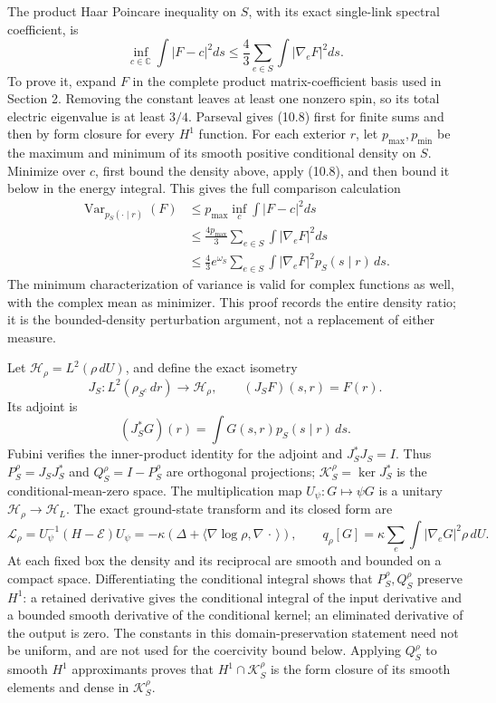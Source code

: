\documentclass[
]{article}
\begin{document}
The product Haar Poincare inequality on \(S\), with its exact
single-link spectral coefficient, is \[
\inf_{c\in\mathbb C}\int|F-c|^2ds
\le\frac43\sum_{e\in S}\int|\nabla_eF|^2ds.                     \tag{10.8}
\] To prove it, expand \(F\) in the complete product matrix-coefficient
basis used in Section 2. Removing the constant leaves at least one
nonzero spin, so its total electric eigenvalue is at least \(3/4\).
Parseval gives (10.8) first for finite sums and then by form closure for
every \(H^1\) function. For each exterior \(r\), let
\(p_{\max},p_{\min}\) be the maximum and minimum of its smooth positive
conditional density on \(S\). Minimize over \(c\), first bound the
density above, apply (10.8), and then bound it below in the energy
integral. This gives the full comparison calculation \[
\begin{split}
\operatorname{Var}_{p_S(\cdot\mid r)}(F)
&\le p_{\max}\inf_c\int|F-c|^2ds\\
&\le\frac{4p_{\max}}3\sum_{e\in S}\int|\nabla_eF|^2ds\\
&\le\frac43 e^{\omega_S}
       \sum_{e\in S}\int|\nabla_eF|^2p_S(s\mid r)\,ds .
\end{split}                                                   \tag{10.9}
\] The minimum characterization of variance is valid for complex
functions as well, with the complex mean as minimizer. This proof
records the entire density ratio; it is the bounded-density perturbation
argument, not a replacement of either measure.

Let \(\mathscr H_\rho=L^2(\rho\,dU)\), and define the exact isometry \[
J_S:L^2(\rho_{S^c}\,dr)\longrightarrow\mathscr H_\rho,\qquad
(J_SF)(s,r)=F(r).
\] Its adjoint is \[
(J_S^*G)(r)=\int G(s,r)p_S(s\mid r)\,ds.
\] Fubini verifies the inner-product identity for the adjoint and
\(J_S^*J_S=I\). Thus \(P_S^\rho=J_SJ_S^*\) and \(Q_S^\rho=I-P_S^\rho\)
are orthogonal projections; \(\mathscr K_S^\rho=\ker J_S^*\) is the
conditional-mean-zero space. The multiplication map
\(U_\psi:G\mapsto\psi G\) is a unitary
\(\mathscr H_\rho\to\mathcal H_L\). The exact ground-state transform and
its closed form are \[
\mathscr L_\rho=U_\psi^{-1}(H-\mathcal E)U_\psi
 =-\kappa(\Delta+\langle\nabla\log\rho,\nabla\,\cdot\,\rangle),
\qquad
q_\rho[G]=\kappa\sum_e\int|\nabla_eG|^2\rho\,dU.                 \tag{10.10}
\] At each fixed box the density and its reciprocal are smooth and
bounded on a compact space. Differentiating the conditional integral
shows that \(P_S^\rho,Q_S^\rho\) preserve \(H^1\): a retained derivative
gives the conditional integral of the input derivative and a bounded
smooth derivative of the conditional kernel; an eliminated derivative of
the output is zero. The constants in this domain-preservation statement
need not be uniform, and are not used for the coercivity bound below.
Applying \(Q_S^\rho\) to smooth \(H^1\) approximants proves that
\(H^1\cap\mathscr K_S^\rho\) is the form closure of its smooth elements
and dense in \(\mathscr K_S^\rho\).
\end{document}
